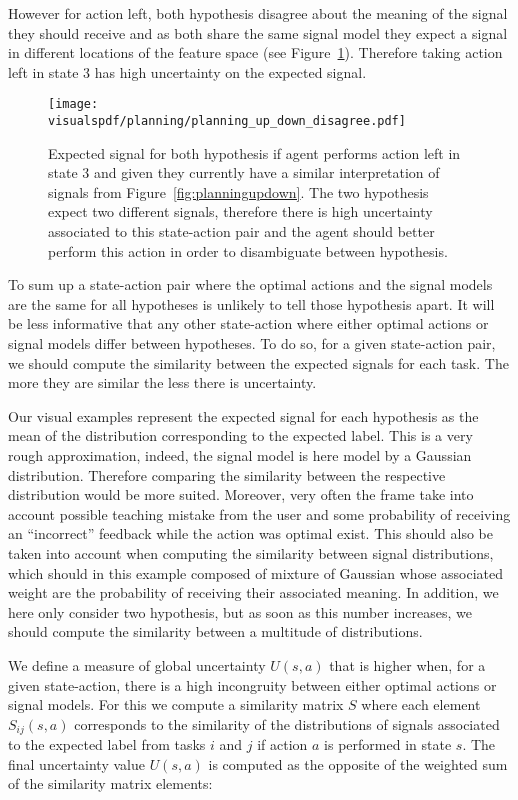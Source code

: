 However for action left, both hypothesis disagree about the meaning of the signal they should receive and as both share the same signal model they expect a signal in different locations of the feature space (see Figure~\ref{fig:uncertaintysignalupdowndisagree}). Therefore taking action left in state 3 has high uncertainty on the expected signal.

\begin{figure}[!htbp]
  \centering
  \texttt{[image: \\visualspdf/planning/planning\_up\_down\_disagree.pdf]}
  \caption{Expected signal for both hypothesis if agent performs action left in state 3 and given they currently have a similar interpretation of signals from Figure~\ref{fig:planningupdown}. The two hypothesis expect two different signals, therefore there is high uncertainty associated to this state-action pair and the agent should better perform this action in order to disambiguate between hypothesis.}
  \label{fig:uncertaintysignalupdowndisagree}
\end{figure}


To sum up a state-action pair where the optimal actions and the signal models are the same for all hypotheses is unlikely to tell those hypothesis apart. It will be less informative that any other state-action where either optimal actions or signal models differ between hypotheses. To do so, for a given state-action pair, we should compute the similarity between the expected signals for each task. The more they are similar the less there is uncertainty.

Our visual examples represent the expected signal for each hypothesis as the mean of the distribution corresponding to the expected label. This is a very rough approximation, indeed, the signal model is here model by a Gaussian distribution. Therefore comparing the similarity between the respective distribution would be more suited. Moreover, very often the frame take into account possible teaching mistake from the user and some probability of receiving an ``incorrect'' feedback while the action was optimal exist. This should also be taken into account when computing the similarity between signal distributions, which should in this example composed of mixture of Gaussian whose associated weight are the probability of receiving their associated meaning. In addition, we here only consider two hypothesis, but as soon as this number increases, we should compute the similarity between a multitude of distributions. 

We define a measure of global uncertainty $U(s,a)$ that is higher when, for a given state-action, there is a high incongruity between either optimal actions or signal models. For this we compute a similarity matrix $S$ where each element $S_{ij}(s,a)$ corresponds to the similarity of the distributions of signals associated to the expected label from tasks $i$ and $j$ if action $a$ is performed in state $s$. The final uncertainty value $U(s,a)$ is computed as the opposite of the weighted sum of the similarity matrix elements:

